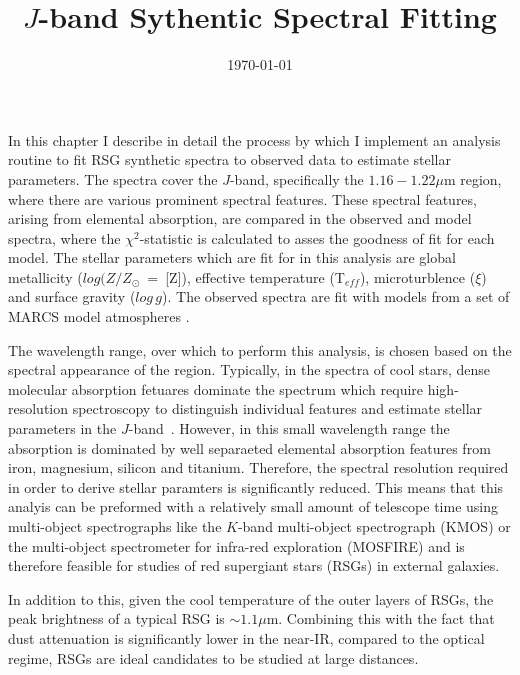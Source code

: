 \documentclass[12pt]{article}
\title{$J$-band Sythentic Spectral Fitting}
\date{\today}
\begin{document}
\maketitle

In this chapter I describe in detail the process by which I implement an analysis
routine to fit RSG synthetic spectra to observed data to estimate stellar parameters.
The spectra cover the $J$-band, specifically the $1.16-1.22\mu$m region, where there are various prominent spectral features.
These spectral features, arising from elemental absorption, are compared in the observed and model spectra,
where the $\chi^{2}$-statistic is calculated to asses the goodness of fit for each model.
The stellar parameters which are fit for in this analysis are global metallicity ($log (Z/Z_{\odot}$~=~[Z]), effective temperature (T$_{eff}$), microturblence ($\xi$) and surface gravity ($log\,g$).
The observed spectra are fit with models from a set of MARCS model atmospheres
\citep{2008A&A...486..951G}.

The wavelength range, over which to perform this analysis,
is chosen based on the spectral appearance of the region.
Typically, in the spectra of cool stars, dense molecular absorption fetuares dominate the spectrum which require high-resolution spectroscopy to distinguish individual features and estimate stellar parameters in the $J$-band~\citep{Cunha07, Davies09a, Davies09b}.
However, in this small wavelength range the absorption is dominated by well separaeted elemental absorption features from iron, magnesium, silicon and titanium.
Therefore, the spectral resolution required in order to derive stellar paramters is significantly reduced.
This means that this analyis can be preformed with a relatively small amount of telescope time using multi-object spectrographs like the $K$-band multi-object spectrograph (KMOS)
or the multi-object spectrometer for infra-red exploration (MOSFIRE) and is therefore feasible for studies of red supergiant stars (RSGs) in external galaxies.

In addition to this, given the cool temperature of the outer layers of RSGs,
the peak brightness of a typical RSG is $\sim1.1\mu$m.
Combining this with the fact that dust attenuation is significantly lower in the near-IR, compared to the optical regime, RSGs are ideal candidates to be studied at large distances.
\end{document}
